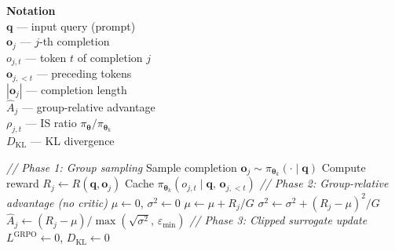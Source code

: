 \documentclass[11pt]{article}
\begin{document}
\begin{algorithm}[p]
\begin{minipage}[t]{0.28\linewidth}
\vspace{6pt}
\textbf{Notation} \\[2pt]
$\mathbf{q}$ --- input query (prompt) \\
$\mathbf{o}_j$ --- $j$-th completion \\
$o_{j,t}$ --- token $t$ of completion $j$ \\
$\mathbf{o}_{j,<t}$ --- preceding tokens \\
$|\mathbf{o}_j|$ --- completion length \\
$\hat{A}_j$ --- group-relative advantage \\
$\rho_{j,t}$ --- IS ratio $\pi_{\boldsymbol{\theta}} / \pi_{\boldsymbol{\theta}_k}$ \\
$D_{\text{KL}}$ --- KL divergence
\end{minipage}%
\hfill
\vrule
\hfill
\begin{minipage}[t]{0.68\linewidth}
\begin{algorithmic}[1]
    \Statex \hspace{\algorithmicindent}\textit{// Phase 1: Group sampling}
            \State Sample completion $\mathbf{o}_j \sim \pi_{\boldsymbol{\theta}_k}(\cdot \mid \mathbf{q})$
            \State Compute reward $R_j \gets R(\mathbf{q}, \mathbf{o}_j)$
                \State Cache $\pi_{\boldsymbol{\theta}_k}(o_{j,t} \mid \mathbf{q},\, \mathbf{o}_{j,<t})$
            \EndFor
        \EndFor
    \EndFor
    \Statex \hspace{\algorithmicindent}\textit{// Phase 2: Group-relative advantage (no critic)}
        \State $\mu \gets 0$, \; $\sigma^2 \gets 0$
            \State $\mu \gets \mu + R_j / G$
        \EndFor
            \State $\sigma^2 \gets \sigma^2 + (R_j - \mu)^2 / G$
        \EndFor
            \State $\hat{A}_j \gets (R_j - \mu) / \max(\sqrt{\sigma^2},\, \varepsilon_{\min})$
        \EndFor
    \EndFor
    \Statex \hspace{\algorithmicindent}\textit{// Phase 3: Clipped surrogate update}
            \State $L^{\text{GRPO}} \gets 0$, \; $D_{\text{KL}} \gets 0$

\end{algorithmic}
\end{minipage}
\end{algorithm}
\end{document}

